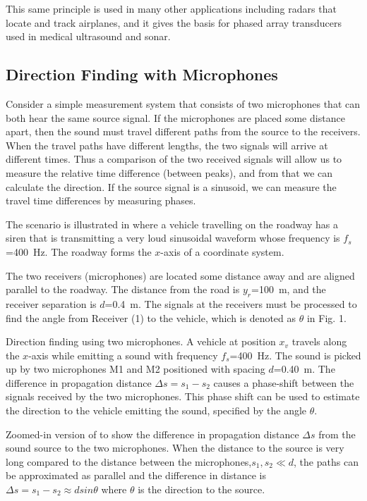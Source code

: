 This same principle is used in many other applications including radars that locate and track airplanes, and it gives the basis for phased array transducers used in medical ultrasound and sonar.

\subsection{Direction Finding with Microphones}
Consider a simple measurement system that consists of two microphones that can both hear the same source signal. If the microphones are placed some distance apart, then the sound must travel different paths from the source to the receivers. When the travel paths have different lengths, the two signals will arrive at different times. Thus a comparison of the two received signals will allow us to measure the relative time difference (between peaks), and from that we can calculate the direction. If the source signal is a sinusoid, we can measure the travel time differences by measuring phases.

The scenario is illustrated in  where a vehicle travelling on the roadway has a siren that is transmitting a very loud sinusoidal waveform whose frequency is $f_s$=\qty{400}{Hz}. The roadway forms the $x$-axis of a coordinate system.

The two receivers (microphones) are located some distance away and are aligned parallel to the roadway. The distance from the road is $y_r$=\qty{100}{m}, and the receiver separation is $d$=\qty{0.4}{m}. The signals at the receivers must be processed to find the angle from Receiver (1) to the vehicle, which is denoted as $\theta$ in Fig. 1.

\begin{stdfig}
	
	\caption{Direction finding using two microphones. A vehicle at position $x_v$ travels along the $x$-axis while emitting a sound with frequency $f_s$=\qty{400}{Hz}. The sound is picked up by two microphones M1 and M2 positioned with spacing $d$=\qty{0.40}{m}. The difference in propagation distance $\Delta s= s_1-s_2$ causes a phase-shift between the signals received by the two microphones. This phase shift can be used to estimate the direction to the vehicle emitting the sound, specified by the angle $\theta$. }
	\label{fig:overview}
\end{stdfig}

\begin{stdfig}
	
	\caption{Zoomed-in version of  to show the difference in propagation distance $\Delta s$ from the sound source to the two  microphones. When the distance to the source is very long compared to the distance between the microphones,$s_1, s_2 \ll d$, the paths can be approximated as parallel and the difference in distance is 
		$\Delta s = s_1 - s_2 \approx d sin \theta$
		where $\theta$ is the direction to the source. }
	\label{fig:far_field_zoom}
\end{stdfig}


